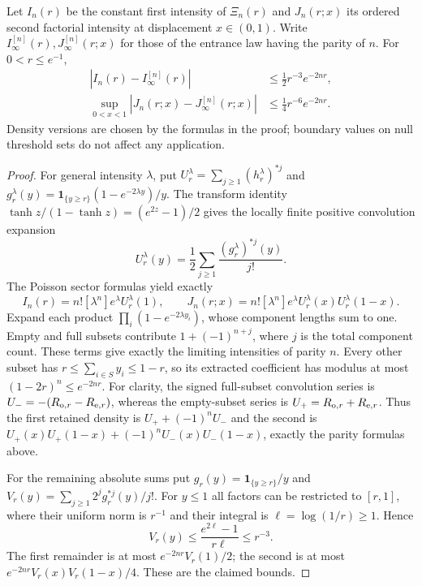 \documentclass[11pt,letterpaper]{article}
\newcommand{\ind}{\mathbf 1}\newcommand{\Exp}{\operatorname{Exp}}
\begin{document}
\begin{lemma}
\label{lem:intensity-coefficients}
Let $I_n(r)$ be the constant first intensity of $\Xi_n(r)$ and
$J_n(r;x)$ its ordered second factorial intensity at displacement
$x\in(0,1)$. Write $I_\infty^{[n]}(r),J_\infty^{[n]}(r;x)$ for those
of the entrance law having the parity of $n$. For $0<r\le e^{-1}$,
\begin{align}
 |I_n(r)-I_\infty^{[n]}(r)|
   &\le\tfrac12 r^{-3}e^{-2nr},\label{eq:first-intensity-error}\\
 \sup_{0<x<1}|J_n(r;x)-J_\infty^{[n]}(r;x)|
   &\le\tfrac14 r^{-6}e^{-2nr}.\label{eq:second-intensity-error}
\end{align}
Density versions are chosen by the formulas in the proof; boundary values
on null threshold sets do not affect any application.
\end{lemma}
\begin{proof}
For general intensity $\lambda$, put
$U_r^\lambda=\sum_{j\ge1}(h_r^\lambda)^{*j}$ and
$g_r^\lambda(y)=\ind_{\{y\ge r\}}(1-e^{-2\lambda y})/y$.
The transform identity $\tanh z/(1-\tanh z)=(e^{2z}-1)/2$ gives the
locally finite positive convolution expansion
\begin{equation}\label{eq:renewal-expansion}
 U_r^\lambda(y)=\frac12\sum_{j\ge1}
                               \frac{(g_r^\lambda)^{*j}(y)}{j!}.
\end{equation}
The Poisson sector formulas yield exactly
\[
 I_n(r)=n![\lambda^n]e^\lambda U_r^\lambda(1),\qquad
 J_n(r;x)=n![\lambda^n]e^\lambda
                         U_r^\lambda(x)U_r^\lambda(1-x).
\]
Expand each product $\prod_i(1-e^{-2\lambda y_i})$, whose component
lengths sum to one. Empty and full subsets contribute
$1+(-1)^{n+j}$, where $j$ is the total component count. These terms
give exactly the limiting intensities of parity $n$. Every other subset
has $r\le\sum_{i\in S}y_i\le1-r$, so its extracted coefficient has
modulus at most $(1-2r)^n\le e^{-2nr}$.
For clarity, the signed full-subset convolution series is
$U_-=-(R_{{\rm o},r}-R_{{\rm e},r})$, whereas the empty-subset series is
$U_+=R_{{\rm o},r}+R_{{\rm e},r}$. Thus the first retained density is
$U_++(-1)^nU_-$ and the second is
$U_+(x)U_+(1-x)+(-1)^nU_-(x)U_-(1-x)$, exactly the parity formulas above.

For the remaining absolute sums put $g_r(y)=\ind_{\{y\ge r\}}/y$ and
$V_r(y)=\sum_{j\ge1}2^j g_r^{*j}(y)/j!$.
For $y\le1$ all factors can be restricted to $[r,1]$, where their
uniform norm is $r^{-1}$ and their integral is $\ell=\log(1/r)\ge1$.
Hence
\[
 V_r(y)\le\frac{e^{2\ell}-1}{r\ell}\le r^{-3}.
\]
The first remainder is at most $e^{-2nr}V_r(1)/2$; the second is at
most $e^{-2nr}V_r(x)V_r(1-x)/4$. These are the claimed bounds.
\end{proof}
\end{document}
